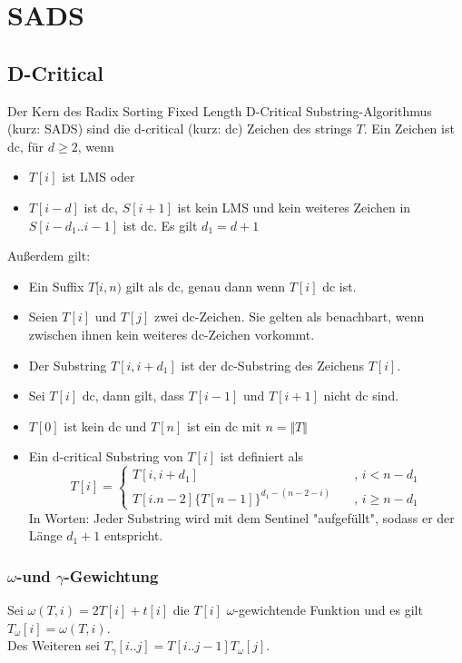 \section{SADS}
\subsection{D-Critical}
\label{dc}


Der  Kern des Radix Sorting Fixed Length D-Critical Substring-Algorithmus\cite[ch.~4.1]{saca:6} (kurz: SADS) sind die d-critical (kurz: dc) Zeichen des strings $T$. Ein Zeichen ist dc, für $d \geq 2$, wenn
\begin{itemize}
    \item $T[i]$ ist LMS oder
    \item $T[i-d]$ ist dc, $S[i+1]$ ist kein LMS und kein weiteres Zeichen in $S[i-d_1..i-1]$ ist dc. Es gilt $d_1=d+1$
\end{itemize}
\bigskip
Außerdem gilt:
\begin{itemize}
    \item   Ein Suffix $T[i,n)$ gilt als dc, genau dann wenn $T[i]$ dc ist.
    \item   Seien $T[i]$ und $T[j]$ zwei dc-Zeichen. Sie gelten als benachbart, wenn zwischen ihnen kein weiteres dc-Zeichen vorkommt.
    \item   Der Substring $T[i, i+d_1]$ ist der dc-Substring des Zeichens $T[i]$.
    \item   Sei $T[i]$ dc, dann gilt, dass $T[i-1]$ und $T[i+1]$ nicht dc sind.
    \item   $T[0]$ ist kein dc und $T[n]$ ist ein dc mit $n=\Vert T \Vert$
    \item   Ein d-critical Substring von $T[i]$ ist definiert als
            \[ T[i] =
              \begin{cases}
                T[i, i+d_1]       & \quad \text{, } i<n-d_1\\
                T[i. n-2]\{T[n-1]\}^{d_1-(n-2-i)}  & \quad \text{, } i\geq n-d_1
              \end{cases}
            \]
            In Worten: Jeder Substring wird mit dem Sentinel "aufgefüllt", sodass er der Länge $d_1+1$ entspricht.
\end{itemize}
\subsubsection{$\omega$-und $\gamma$-Gewichtung}
\label{weighting}
Sei $\omega(T,i)=2T[i]+t[i]$ die $T[i]$ $\omega$-gewichtende Funktion und es gilt $T_\omega[i]=\omega(T,i)$.
\\Des Weiteren sei $T_\gamma[i..j]=T[i..j-1]T_\omega[j]$.
\newpage
